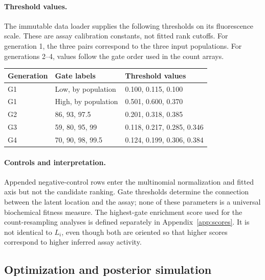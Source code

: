 \paragraph{Threshold values.}
The immutable data loader supplies the following thresholds on its fluorescence
scale. These are assay calibration constants, not fitted rank cutoffs.
For generation 1, the three pairs correspond to the three input populations.
For generations 2--4, values follow the gate order used in the count arrays.
\begin{center}
\small
\begin{tabular}{lll}
\toprule
Generation & Gate labels & Threshold values \\
\midrule
G1 & Low, by population & 0.100, 0.115, 0.100 \\
G1 & High, by population & 0.501, 0.600, 0.370 \\
G2 & 86, 93, 97.5 & 0.201, 0.318, 0.385 \\
G3 & 59, 80, 95, 99 & 0.118, 0.217, 0.285, 0.346 \\
G4 & 70, 90, 98, 99.5 & 0.124, 0.199, 0.306, 0.384 \\
\bottomrule
\end{tabular}
\end{center}

\paragraph{Controls and interpretation.}
Appended negative-control rows enter the multinomial normalization and fitted
axis but not the candidate ranking. Gate thresholds determine the connection
between the latent location and the assay; none of these parameters is a
universal biochemical fitness measure. The highest-gate enrichment score used
for the count-resampling analyses is defined separately in
Appendix~\ref{app:scores}. It is not identical to $L_i$, even though both
are oriented so that higher scores correspond to higher inferred assay activity.

\subsection{Optimization and posterior simulation}
\label{app:inference-details}

